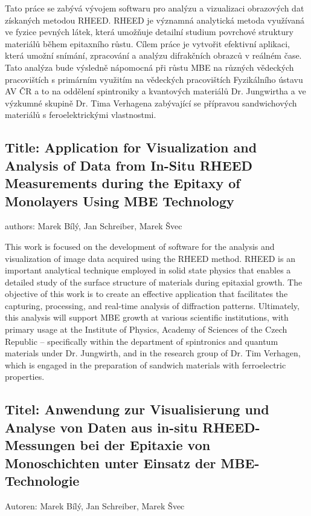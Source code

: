 \documentclass{article}
\begin{document}
Tato práce se zabývá vývojem softwaru pro analýzu a vizualizaci obrazových dat získaných metodou RHEED. RHEED je významná analytická metoda využívaná ve fyzice pevných látek, která umožňuje detailní studium povrchové struktury materiálů během epitaxního růstu. Cílem práce je vytvořit efektivní aplikaci, která umožní snímání, zpracování a analýzu difrakčních obrazců v reálném čase. Tato analýza bude výsledně nápomocná při růstu MBE na různých vědeckých pracovištích s primárním využitím na vědeckých pracovištích Fyzikálního ústavu AV ČR a to na oddělení spintroniky a kvantových materiálů Dr. Jungwirtha a ve výzkumné skupině Dr. Tima Verhagena zabývající se přípravou sandwichových materiálů s feroelektrickými vlastnostmi.

\subsection*{Title: Application for Visualization and Analysis of Data from In-Situ RHEED Measurements during the Epitaxy of Monolayers Using MBE Technology}
authors: Marek Bílý, Jan Schreiber, Marek Švec
\vspace{0.5cm}

This work is focused on the development of software for the analysis and visualization of image data acquired using the RHEED method. RHEED is an important analytical technique employed in solid state physics that enables a detailed study of the surface structure of materials during epitaxial growth. The objective of this work is to create an effective application that facilitates the capturing, processing, and real-time analysis of diffraction patterns. Ultimately, this analysis will support MBE growth at various scientific institutions, with primary usage at the Institute of Physics, Academy of Sciences of the Czech Republic – specifically within the department of spintronics and quantum materials under Dr. Jungwirth, and in the research group of Dr. Tim Verhagen, which is engaged in the preparation of sandwich materials with ferroelectric properties.

\subsection*{Titel: Anwendung zur Visualisierung und Analyse von Daten aus in-situ RHEED-Messungen bei der Epitaxie von Monoschichten unter Einsatz der MBE-Technologie}
Autoren: Marek Bílý, Jan Schreiber, Marek Švec
\vspace{0.5cm}
\end{document}
